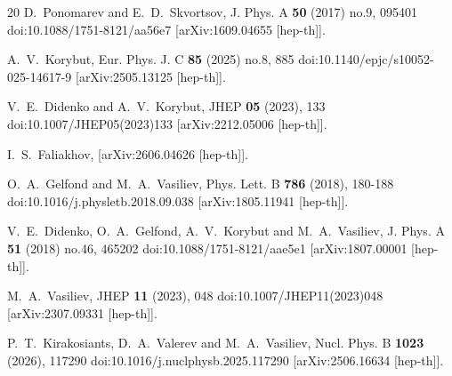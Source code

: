 \documentclass[12pt]{article}
\begin{document}
\begin{thebibliography}{20}
D.~Ponomarev and E.~D.~Skvortsov,
J. Phys. A \textbf{50} (2017) no.9, 095401
doi:10.1088/1751-8121/aa56e7
[arXiv:1609.04655 [hep-th]].

A.~V.~Korybut,
Eur. Phys. J. C \textbf{85} (2025) no.8, 885
doi:10.1140/epjc/s10052-025-14617-9
[arXiv:2505.13125 [hep-th]].

V.~E.~Didenko and A.~V.~Korybut,
JHEP \textbf{05} (2023), 133
doi:10.1007/JHEP05(2023)133
[arXiv:2212.05006 [hep-th]].

I.~S.~Faliakhov,
[arXiv:2606.04626 [hep-th]].

O.~A.~Gelfond and M.~A.~Vasiliev,
Phys. Lett. B \textbf{786} (2018), 180-188
doi:10.1016/j.physletb.2018.09.038
[arXiv:1805.11941 [hep-th]].

V.~E.~Didenko, O.~A.~Gelfond, A.~V.~Korybut and M.~A.~Vasiliev,
J. Phys. A \textbf{51} (2018) no.46, 465202
doi:10.1088/1751-8121/aae5e1
[arXiv:1807.00001 [hep-th]].

M.~A.~Vasiliev,
JHEP \textbf{11} (2023), 048
doi:10.1007/JHEP11(2023)048
[arXiv:2307.09331 [hep-th]].

P.~T.~Kirakosiants, D.~A.~Valerev and M.~A.~Vasiliev,
Nucl. Phys. B \textbf{1023} (2026), 117290
doi:10.1016/j.nuclphysb.2025.117290
[arXiv:2506.16634 [hep-th]].


\end{thebibliography}
\end{document}
